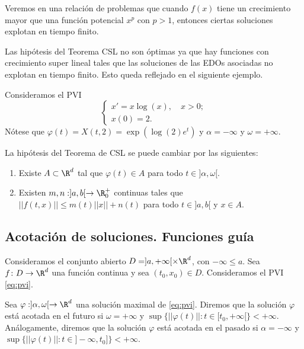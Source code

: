 \documentclass{article}
\begin{document}
\begin{remark}
  Veremos en una relación de problemas que cuando $f(x)$ tiene un crecimiento mayor que una función
  potencial $x^p$ con $p > 1$, entonces ciertas soluciones explotan en tiempo finito.
\end{remark}

Las hipótesis del Teorema CSL no son óptimas ya que hay funciones con crecimiento super lineal tales
que las soluciones de las EDOs asociadas no explotan en tiempo finito. Esto queda reflejado en el
siguiente ejemplo.

\begin{ex}
  Consideramos el PVI
  \[
    \begin{cases}
      x' = x \log(x), \quad x > 0; \\
      x(0) = 2.
    \end{cases}
  \]
  Nótese que $\varphi(t) = X(t, 2) = \exp(\log(2) e^t)$ y $\alpha = -\infty$ y $\omega = +\infty$.
\end{ex}

\begin{remark}
  La hipótesis del Teorema de CSL se puede cambiar por las siguientes:
  
\begin{enumerate}
\item Existe $A \subset \R^d$ tal que $\varphi(t) \in A$ para todo $t \in ]\alpha, \omega[$.
\item Existen $m, n: ]a,b[ \to \R_0^+$ continuas tales que $||f(t,x)|| \le m(t) ||x|| + n(t)$ para todo $t \in ]a,b[$ y $x \in A$.
\end{enumerate}
\end{remark}


\subsection{Acotación de soluciones. Funciones guía}

Consideramos el conjunto abierto $D = ]a, +\infty[ \times \R^d$, con $-\infty \le a$. Sea
$f\colon D \to \R^d$ una función continua y sea $(t_0, x_0) \in D$. Consideramos el PVI \eqref{eq:pvi}.

\begin{definition}
  Sea $\varphi: ]\alpha, \omega[ \to \R^d$ una solución maximal de \eqref{eq:pvi}. Diremos que la
  solución $\varphi$ está acotada en el futuro si $\omega = +\infty$ y
  $\sup \{||\varphi(t)||: t \in [t_0, +\infty[\} < +\infty$. Análogamente, diremos que la solución
  $\varphi$ está acotada en el pasado si $\alpha = -\infty$ y
  $\sup \{||\varphi(t)||: t \in ]-\infty, t_0]\} < +\infty$.
\end{definition}
\end{document}
